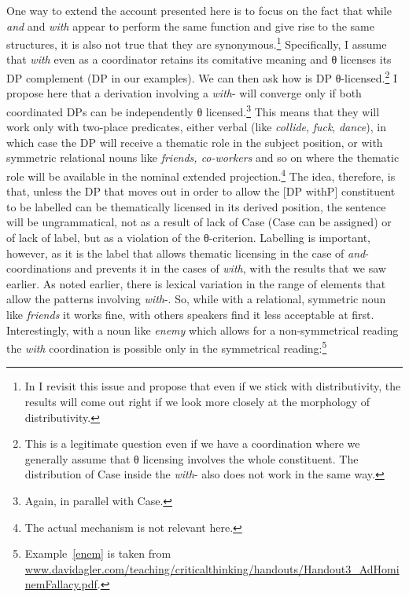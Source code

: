 \documentclass[output=paper]{langsci/langscibook}
\begin{document}
One way to extend the account presented here is to focus on the fact that while
\emph{and} and \emph{with} appear to perform the same function and give rise to
the same structures, it is also not true that they are synonymous.\footnote{In
 I revisit this issue and propose that even if we stick
with distributivity, the results will come out right if we look more closely at
the morphology of distributivity.} Specifically, I assume that \emph{with} even
as a coordinator retains its comitative meaning and θ licenses its DP
complement (DP in our examples). We can then ask how is DP
θ-licensed.\footnote{This is a legitimate question even if we have a
coordination where we generally assume that θ licensing involves the
whole constituent. The distribution of Case inside the \emph{with}-
also does not work in the same way.} I propose here that a derivation involving
a \emph{with}- will converge only if both coordinated DPs can be
independently θ licensed.\footnote{Again, in parallel with Case.}  This
means that they will work only with two-place predicates, either verbal (like
\emph{collide}, \emph{fuck}, \emph{dance}), in which case the DP will receive a
thematic role in the subject position, or with symmetric relational nouns like
\emph{friends, co-workers} and so on where the thematic role will be available
in the nominal extended projection.\footnote{The actual mechanism is not
relevant here.} The idea, therefore, is that, unless the DP that moves out in
order to allow the [DP withP] constituent to be labelled can be thematically
licensed in its derived position, the sentence will be ungrammatical, not as a
result of lack of Case (Case can be assigned) or of lack of label, but as a
violation of the θ-criterion. Labelling is important, however, as it is
the label that allows thematic licensing in the case of
\emph{and}-coordinations and prevents it in the cases of \emph{with}, with the
results that we saw earlier. As noted earlier, there is lexical variation in
the range of elements that allow the patterns involving
\emph{with}-. So, while with a relational, symmetric noun
like \emph{friends} it works fine, with others speakers find it less acceptable
at first. Interestingly, with a noun like \emph{enemy} which allows for a
non-symmetrical reading the \emph{with} coordination is possible only in the
symmetrical reading:\footnote{Example~\eqref{enem} is taken from
\url{www.davidagler.com/teaching/criticalthinking/handouts/Handout3_AdHominemFallacy.pdf}.}
\end{document}

